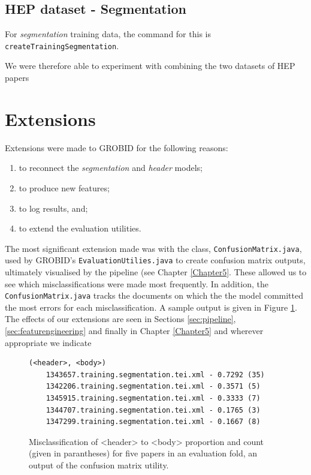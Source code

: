 \subsection{HEP dataset - Segmentation}
\label{subsec:hepdatasetsegmentation}

For \emph{segmentation} training data, the command for this is \texttt{createTrainingSegmentation}. 

We were therefore able to experiment with combining the two datasets of HEP papers

\section{Extensions}

Extensions were made to GROBID for the following reasons:

\begin{enumerate}
\item to reconnect the \emph{segmentation} and \emph{header} models;
\item to produce new features;
\item to log results, and;
\item to extend the evaluation utilities.
\end{enumerate}

The most significant extension made was with the class, \texttt{ConfusionMatrix.java}, used by GROBID's \texttt{EvaluationUtilies.java} to create confusion matrix outputs, ultimately visualised by the pipeline (see Chapter \ref{Chapter5}. These allowed us to see which misclassifications were made most frequently. In addition, the \texttt{ConfusionMatrix.java} tracks the documents on which the the model committed the most errors for each misclassification. A sample output is given in Figure \ref{fig:topk}. The effects of our extensions are seen in Sections \ref{sec:pipeline}, \ref{sec:featurengineering} and finally in Chapter \ref{Chapter5} and wherever appropriate we indicate 

\begin{figure}
\centering
\begin{BVerbatim}
(<header>, <body>)
	1343657.training.segmentation.tei.xml - 0.7292 (35)
	1342206.training.segmentation.tei.xml - 0.3571 (5)
	1345915.training.segmentation.tei.xml - 0.3333 (7)
	1344707.training.segmentation.tei.xml - 0.1765 (3)
	1347299.training.segmentation.tei.xml - 0.1667 (8)
\end{BVerbatim}
\caption{Misclassification of <header> to <body> proportion and count (given in parantheses) for five papers in an evaluation fold, an output of the confusion matrix utility.}
\label{fig:topk}
\end{figure}


